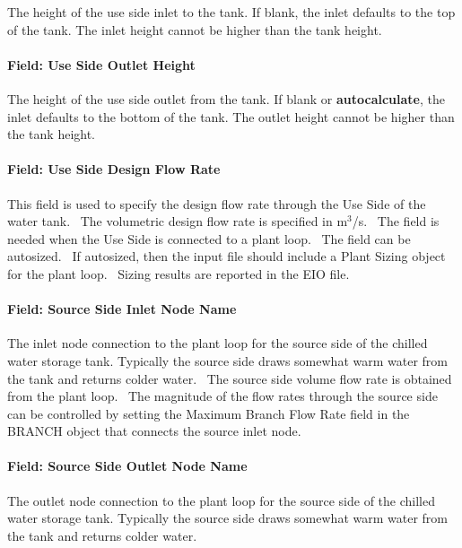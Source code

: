 The height of the use side inlet to the tank. If blank, the inlet defaults to the top of the tank. The inlet height cannot be higher than the tank height.

\paragraph{Field: Use Side Outlet Height}\label{field-use-side-outlet-height}

The height of the use side outlet from the tank. If blank or \textbf{autocalculate}, the inlet defaults to the bottom of the tank. The outlet height cannot be higher than the tank height.

\paragraph{Field: Use Side Design Flow Rate}\label{field-use-side-design-flow-rate-1}

This field is used to specify the design flow rate through the Use Side of the water tank.~ The volumetric design flow rate is specified in m\(^{3}\)/s.~ The field is needed when the Use Side is connected to a plant loop.~ The field can be autosized.~ If autosized, then the input file should include a Plant Sizing object for the plant loop.~ Sizing results are reported in the EIO file.

\paragraph{Field: Source Side Inlet Node Name}\label{field-source-side-inlet-node-name-5}

The inlet node connection to the plant loop for the source side of the chilled water storage tank. Typically the source side draws somewhat warm water from the tank and returns colder water.~ The source side volume flow rate is obtained from the plant loop.~ The magnitude of the flow rates through the source side can be controlled by setting the Maximum Branch Flow Rate field in the BRANCH object that connects the source inlet node.

\paragraph{Field: Source Side Outlet Node Name}\label{field-source-side-outlet-node-name-5}

The outlet node connection to the plant loop for the source side of the chilled water storage tank. Typically the source side draws somewhat warm water from the tank and returns colder water.

